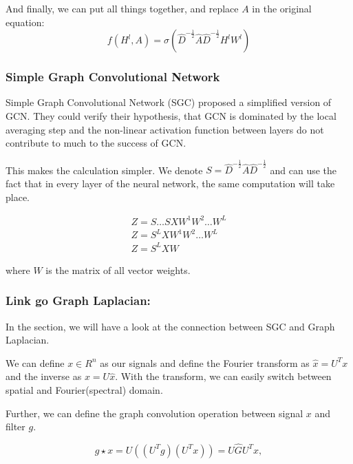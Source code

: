 And finally, we can put all things together, and replace $A$ in the original equation:
\begin{equation}
    f( H^l, A) = \sigma (\hat{D}^{-\frac{1}{2}} \hat{A} \hat{D}^{-\frac{1}{2}} H^l W^l)
\end{equation} 


\subsubsection{Simple Graph Convolutional Network}
Simple Graph Convolutional Network (SGC) \cite{simpleGCN} proposed a simplified version of GCN.
They could verify their hypothesis, that GCN is dominated by the local averaging step and the non-linear 
activation function between layers do not contribute to much to the success of GCN.

This makes the calculation simpler. We denote $S = \hat{D}^{-\frac{1}{2}} \hat{A} \hat{D}^{-\frac{1}{2}} $
and can use the fact that in every layer of the neural network, the same computation will take place.

\begin{equation}
    \begin{aligned}
        Z = S \dots S X W^1 W^2 \dots W^L \\
        Z = S^L X W^1 W^2 \dots W^L \\
        Z = S^L X W    
    \end{aligned}
\end{equation}

where $W$ is the matrix of all vector weights.



\subsubsection{Link go Graph Laplacian:}

In the section, we will have a look at the connection between SGC and Graph Laplacian.

We can define $x \in R^n$ as our signals and define the Fourier transform as $\hat{x} = U^T x$
and the inverse as $x = U\hat{x}$. 
With the transform, we can easily switch between spatial and Fourier(spectral) domain.

Further, we can define the graph convolution operation between signal $x$ and filter $g$.

\begin{equation}
    g \star x = U((U^T g) (U^T x)) = U \hat{G} U^T x,
\end{equation}

